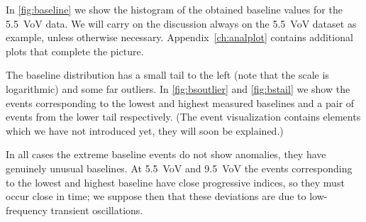 In \autoref{fig:baseline} we show the histogram of the obtained baseline values
for the \SI{5.5}{VoV} data. We will carry on the discussion always on the
\SI{5.5}{VoV} dataset as example, unless otherwise necessary.
Appendix~\ref{ch:analplot} contains additional plots that complete the picture.

The baseline distribution has a small tail to the left (note that the scale is
logarithmic) and some far outliers. In \autoref{fig:bsoutlier} and
\autoref{fig:bstail} we show the events corresponding to the lowest and highest
measured baselines and a pair of events from the lower tail respectively. (The
event visualization contains elements which we have not introduced yet, they
will soon be explained.)

\begin{figure}
    
    
    
\end{figure}

\begin{figure}
    


\end{figure}

\begin{figure}
    


\end{figure}

In all cases the extreme baseline events do not show anomalies, they have
genuinely unusual baselines. At \SI{5.5}{VoV} and \SI{9.5}{VoV} the events
corresponding to the lowest and highest baseline have close progressive
indices, so they must occur close in time; we suppose then that these
deviations are due to low-frequency transient oscillations.

